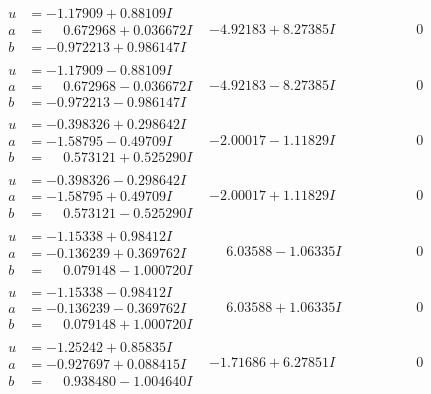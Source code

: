 \documentclass[1p]{elsarticle_modified}
\theoremstyle{definition}
\begin{document}
$$\begin{array}{c|c|c}
\begin{aligned}
u &= -1.17909 + 0.88109 I \\
a &= \phantom{-}0.672968 + 0.036672 I \\
b &= -0.972213 + 0.986147 I\end{aligned}
 & -4.92183 + 8.27385 I & \phantom{-0.000000 } 0 \\ \hline\begin{aligned}
u &= -1.17909 - 0.88109 I \\
a &= \phantom{-}0.672968 - 0.036672 I \\
b &= -0.972213 - 0.986147 I\end{aligned}
 & -4.92183 - 8.27385 I & \phantom{-0.000000 } 0 \\ \hline\begin{aligned}
u &= -0.398326 + 0.298642 I \\
a &= -1.58795 - 0.49709 I \\
b &= \phantom{-}0.573121 + 0.525290 I\end{aligned}
 & -2.00017 - 1.11829 I & \phantom{-0.000000 } 0 \\ \hline\begin{aligned}
u &= -0.398326 - 0.298642 I \\
a &= -1.58795 + 0.49709 I \\
b &= \phantom{-}0.573121 - 0.525290 I\end{aligned}
 & -2.00017 + 1.11829 I & \phantom{-0.000000 } 0 \\ \hline\begin{aligned}
u &= -1.15338 + 0.98412 I \\
a &= -0.136239 + 0.369762 I \\
b &= \phantom{-}0.079148 - 1.000720 I\end{aligned}
 & \phantom{-}6.03588 - 1.06335 I & \phantom{-0.000000 } 0 \\ \hline\begin{aligned}
u &= -1.15338 - 0.98412 I \\
a &= -0.136239 - 0.369762 I \\
b &= \phantom{-}0.079148 + 1.000720 I\end{aligned}
 & \phantom{-}6.03588 + 1.06335 I & \phantom{-0.000000 } 0 \\ \hline\begin{aligned}
u &= -1.25242 + 0.85835 I \\
a &= -0.927697 + 0.088415 I \\
b &= \phantom{-}0.938480 - 1.004640 I\end{aligned}
 & -1.71686 + 6.27851 I & \phantom{-0.000000 } 0 \\ \hline\begin{aligned}

\end{aligned}
\end{array}$$
\end{document}
